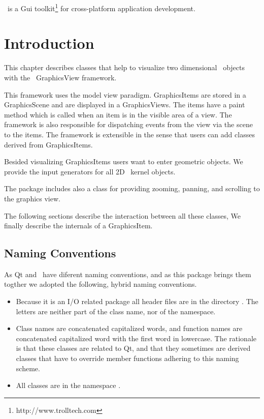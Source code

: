 

\qt\ is a {\sc Gui} toolkit\footnote{http://www.trolltech.com} for
cross-platform application development. 

\section{Introduction}

This chapter describes classes that help to visualize two dimensional \cgal\ objects
with the \qt\ GraphicsView framework.

This framework uses the model view paradigm. GraphicsItems are stored in a 
GraphicsScene and are displayed in a GraphicsViews. The items 
have a paint method which is called when an item is in the visible area of a view.
The framework is also responsible for dispatching events from the view
via the scene to the items. The framework is extensible in the sense
that users can add classes derived from GraphicsItems.

Besided visualizing GraphicsItems users want to enter geometric objects.
We provide the input generators for all 2D \cgal\ kernel objects.

The package includes also a class for providing zooming, panning, and scrolling
to the graphics view.


The following sections describe the interaction between all these classes,
We finally describe the internals of a GraphicsItem.

\subsection{Naming Conventions}

As Qt and \cgal\ have diferent naming conventions, and as this package
brings them togther we adopted the following, hybrid naming conventions.

\begin{itemize}
\item Because it is an I/O related package all header files are in the directory
. The letters  are neither part of the class name, nor 
      of the namespace.
\item Class names are concatenated capitalized words, and function names are
      concatenated capitalized word with the first word in lowercase. The rationale is that
      these classes are related to Qt, and that they sometimes are derived
      classes that have to override member functions adhering to this naming scheme.
\item All classes are in the namespace .
\end{itemize}
 


